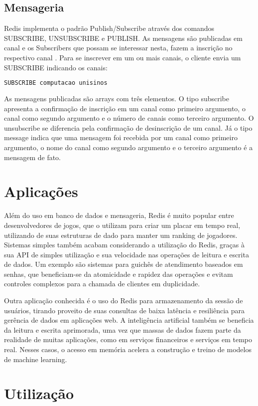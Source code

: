 \documentclass[12pt]{article}
\begin{document}
\subsection{Mensageria}
Redis implementa o padrão Publish/Subscribe através dos comandos SUBSCRIBE, UNSUBSCRIBE e PUBLISH. As mensagens são publicadas em canal e os Subscribers que possam se interessar nesta, fazem a inscrição no respectivo canal \cite{faria2019}. Para se inscrever em um ou mais canais, o cliente envia um SUBSCRIBE indicando os canais:
\begin{lstlisting}[language=Sql]
SUBSCRIBE computacao unisinos
\end{lstlisting}

As mensagens publicadas são arrays com três elementos. O tipo subscribe  apresenta a confirmação de inscrição em um canal como primeiro argumento, o canal como segundo argumento e o número de canais como terceiro argumento. O unsubscribe se diferencia pela confirmação de desinscrição de um canal. Já o tipo message indica que uma mensagem foi recebida por um canal como primeiro argumento, o nome do canal como segundo argumento e o terceiro argumento é a mensagem de fato.

\section{Aplicações}
Além do uso em banco de dados e mensageria, Redis é muito popular entre desenvolvedores de jogos, que o utilizam para criar um placar em tempo real, utilizando de suas estruturas de dado para manter um ranking de jogadores. Sistemas simples também acabam considerando a utilização do Redis, graças à sua API de simples utilização e sua velocidade nas operações de leitura e escrita de dados. Um exemplo são sistemas para guichês de atendimento baseados em senhas, que beneficiam-se da atomicidade e rapidez das operações e evitam controles complexos para a chamada de clientes em duplicidade.

Outra aplicação conhecida é o uso do Redis para armazenamento da sessão de usuários, tirando proveito de suas consultas de baixa latência e resiliência para gerência de dados em aplicações web.
A inteligência artificial também se beneficia da leitura e escrita aprimorada, uma vez que massas de dados fazem parte da realidade de muitas aplicações, como em serviços financeiros e serviços em tempo real. Nesses casos, o acesso em memória acelera a construção e treino de modelos de machine learning.

\section{Utilização}
\end{document}
